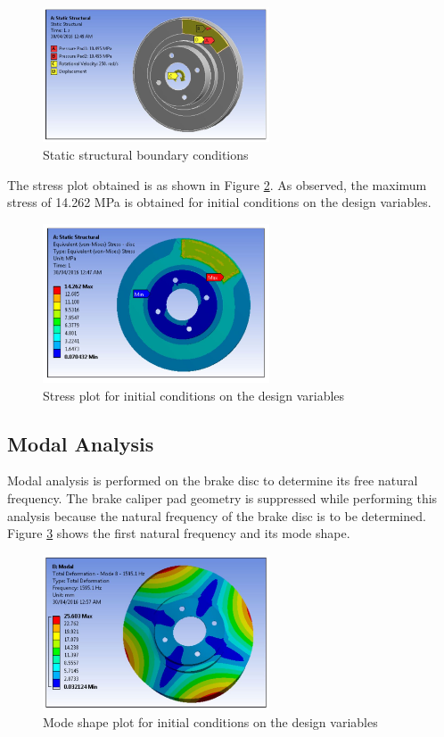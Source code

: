 \documentclass[12pt]{article}
\begin{document}
\begin{figure}[H]
\begin{center}
\includegraphics[width=0.6\textwidth]{bc.jpg}
\caption{Static structural boundary conditions}
\label{bc}
\end{center}
\end{figure}
The stress plot obtained is as shown in Figure \ref{stress}. As observed, the maximum stress of 14.262 MPa is obtained for initial conditions on the design variables.
\begin{figure}[H]
\begin{center}
\includegraphics[width=0.6\textwidth]{stress.jpg}
\caption{Stress plot for initial conditions on the design variables}
\label{stress}
\end{center}
\end{figure}

\subsection{Modal Analysis}
Modal analysis is performed on the brake disc to determine its free natural frequency. The brake caliper pad geometry is suppressed while performing this analysis because the natural frequency of the brake disc is to be determined. Figure \ref{mode} shows the first natural frequency and its mode shape.
\begin{figure}[H]
\begin{center}
\includegraphics[width=0.6\textwidth]{mode.jpg}
\caption{Mode shape plot for initial conditions on the design variables}
\label{mode}
\end{center}
\end{figure}
\end{document}
